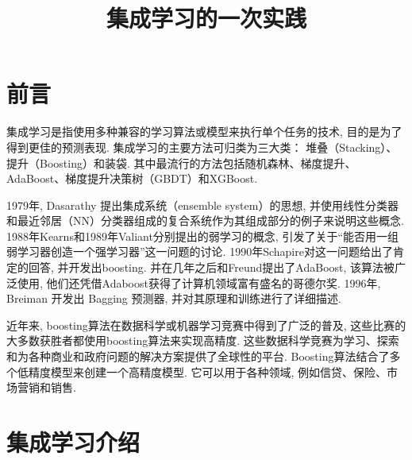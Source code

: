 \documentclass[lang=cn,11pt]{elegantpaper}
\title{集成学习的一次实践}
\date{}
\begin{document}
\newpage
\maketitle

	
\tableofcontents
\thispagestyle{empty}
\newpage
\normalsize
{}


\section{前言}

集成学习是指使用多种兼容的学习算法或模型来执行单个任务的技术, 目的是为了得到更佳的预测表现. 集成学习的主要方法可归类为三大类： 堆叠（Stacking）、提升（Boosting）和装袋. 其中最流行的方法包括随机森林、梯度提升、AdaBoost、梯度提升决策树（GBDT）和XGBoost. 

1979年, Dasarathy 提出集成系统（ensemble system）的思想, 并使用线性分类器和最近邻居（NN）分类器组成的复合系统作为其组成部分的例子来说明这些概念. 1988年Kearns和1989年Valiant分别提出的弱学习的概念, 引发了关于“能否用一组弱学习器创造一个强学习器”这一问题的讨论. 1990年Schapire对这一问题给出了肯定的回答, 并开发出boosting. 并在几年之后和Freund提出了AdaBoost, 该算法被广泛使用, 他们还凭借Adaboost获得了计算机领域富有盛名的哥德尔奖. 1996年, Breiman 开发出 Bagging 预测器, 并对其原理和训练进行了详细描述. 

近年来, boosting算法在数据科学或机器学习竞赛中得到了广泛的普及, 这些比赛的大多数获胜者都使用boosting算法来实现高精度. 这些数据科学竞赛为学习、探索和为各种商业和政府问题的解决方案提供了全球性的平台. Boosting算法结合了多个低精度模型来创建一个高精度模型. 它可以用于各种领域, 例如信贷、保险、市场营销和销售. 

\section{集成学习介绍}
\end{document}
